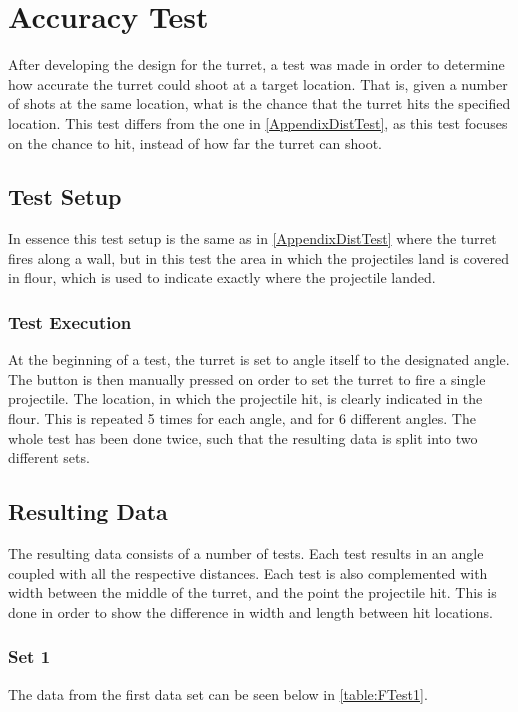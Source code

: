 \chapter{Accuracy Test}\label{AppendixAccTest}
After developing the design for the turret, a test was made in order to
determine how accurate the turret could shoot at a target location. That is,
given a number of shots at the same location, what is the chance that the turret
hits the specified location. This test differs from the one in
\autoref{AppendixDistTest}, as this test focuses on the chance to hit, instead
of how far the turret can shoot.

\section{Test Setup}
In essence this test setup is the same as in \autoref{AppendixDistTest} where
the turret fires along a wall, but in this test the area in which the
projectiles land is covered in flour, which is used to indicate exactly
where the projectile landed.

\subsection{Test Execution}
At the beginning of a test, the turret is set to angle itself to the designated
angle. The button is then manually pressed on order to set the turret to fire a
single projectile. The location, in which the projectile hit, is clearly
indicated in the flour. This is repeated 5 times for each angle, and for 6
different angles. The whole test has been done twice, such that the resulting
data is split into two different sets.

\section{Resulting Data}
The resulting data consists of a number of tests. Each test results in an angle
coupled with all the respective distances. Each test is also complemented with
width between the middle of the turret, and the point the projectile hit. This
is done in order to show the difference in width and length between hit
locations.

\subsection{Set 1}
The data from the first data set can be seen below in \autoref{table:FTest1}. 

